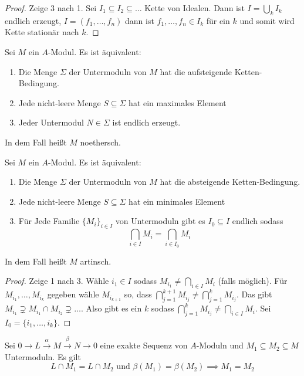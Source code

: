 \begin{proof}
    Zeige 3 nach 1. Sei $I_1\subseteq I_2\subseteq\dots$ Kette von Idealen. Dann ist $I=\bigcup_kI_k$ endlich erzeugt, $I=(f_1,\dots,f_n)$ dann ist $f_1,\dots,f_n\in I_k$ für ein $k$ und somit wird Kette stationär nach $k$.
\end{proof}
\begin{Satz}
    Sei $M$ ein $A$-Modul. Es ist äquivalent:
    \begin{enumerate}
        \item Die Menge $\Sigma$ der Untermoduln von $M$ hat die aufsteigende Ketten-Bedingung.
        \item Jede nicht-leere Menge $S\subseteq \Sigma$ hat ein maximales Element
        \item Jeder Untermodul $N\in\Sigma$ ist endlich erzeugt.
    \end{enumerate}
    In dem Fall heißt $M$ noethersch.
\end{Satz}
\begin{Satz}
    Sei $M$ ein $A$-Modul. Es ist äquivalent:
    \begin{enumerate}
        \item Die Menge $\Sigma$ der Untermoduln von $M$ hat die absteigende Ketten-Bedingung.
        \item Jede nicht-leere Menge $S\subseteq \Sigma$ hat ein minimales Element
        \item Für Jede Familie $\{M_i\}_{i\in I}$ von Untermoduln gibt es $I_0\subseteq I$ endlich sodass $$\bigcap_{i\in I}M_i=\bigcap_{i\in I_0}M_i$$
    \end{enumerate}
    In dem Fall heißt $M$ artinsch.
\end{Satz}
\begin{proof}
    Zeige 1 nach 3. Wähle $i_1\in I$ sodass $M_{i_1}\neq\bigcap_{i\in I}M_i$ (falls möglich). Für $M_{i_1},\dots,M_{i_k}$ gegeben wähle $M_{i_{k+1}}$ so, dass $\bigcap_{j=1}^{k+1}M_{i_j}\neq \bigcap_{j=1}^kM_{i_j}$. Das gibt $M_{i_1}\supsetneq M_{i_1}\cap M_{i_2}\supsetneq\dots$. Also gibt es ein $k$ sodass $\bigcap_{j=1}^{k}M_{i_j}\neq \bigcap_{i\in I}M_{i}$. Sei $I_0=\{i_1,\dots,i_k\}.$
\end{proof}
\begin{Lemma}\label{Lem:UntermodExSeq}
    Sei $0\to L\stackrel{\alpha}\to M\stackrel \beta\to N\to 0$ eine exakte Sequenz von $A$-Moduln und $M_1\subseteq M_2\subseteq M$ Untermoduln. Es gilt 
    $$L\cap M_1=L\cap M_2\text{ und }\beta(M_1)=\beta(M_2)\implies M_1=M_2$$
\end{Lemma}
